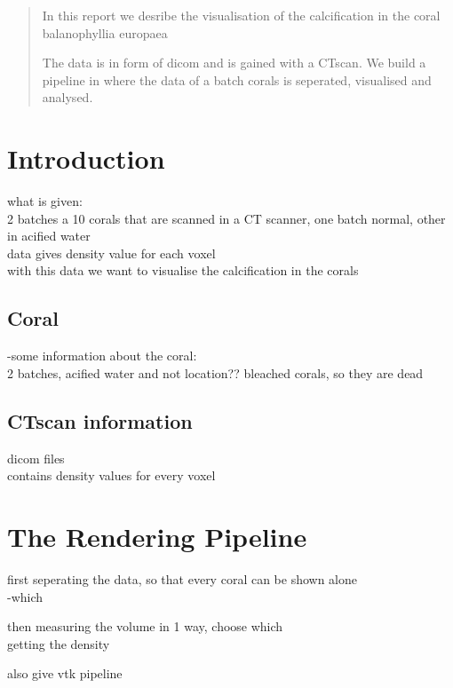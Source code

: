 \documentclass[12pt]{article}
\author{Kristin Rieping (10252428) \and Toby \and Mihai \and Robrecht}
\date{today}
\begin{document}
\maketitle

\begin{abstract}
In this report we desribe the visualisation of the calcification in the coral balanophyllia europaea

The data is in form of dicom and is gained with a CTscan. We build a pipeline in where the data of a batch corals is seperated, visualised and analysed.
\end{abstract}

\section{Introduction}
what is given:\\
2 batches a 10 corals that are scanned in a CT scanner, one batch normal, other in acified water\\
data gives density value for each voxel\\
with this data we want to visualise the calcification in the corals\\


\subsection{Coral}
-some information about the coral:\\
2 batches, acified water and not
location??
bleached corals, so they are dead

\subsection{CTscan information}

dicom files\\
contains density values for every voxel\\


\section{The Rendering Pipeline}
first seperating the data, so that every coral can be shown alone\\
-which 

then measuring the volume in 1 way, choose which\\
getting the density 

also give vtk pipeline
\end{document}
